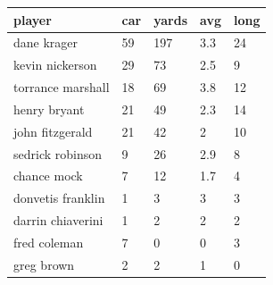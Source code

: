 \documentclass{article}
\begin{document}
\begin{tabular}{lllll}
\toprule
player & car & yards & avg & long \\
\midrule
dane krager & 59 & 197 & 3.3 & 24 \\
kevin nickerson & 29 & 73 & 2.5 & 9 \\
torrance marshall & 18 & 69 & 3.8 & 12 \\
henry bryant & 21 & 49 & 2.3 & 14 \\
john fitzgerald & 21 & 42 & 2 & 10 \\
sedrick robinson & 9 & 26 & 2.9 & 8 \\
chance mock & 7 & 12 & 1.7 & 4 \\
donvetis franklin & 1 & 3 & 3 & 3 \\
darrin chiaverini & 1 & 2 & 2 & 2 \\
fred coleman & 7 & 0 & 0 & 3 \\
greg brown & 2 & 2 & 1 & 0 \\
\bottomrule
\end{tabular}
\end{document}
